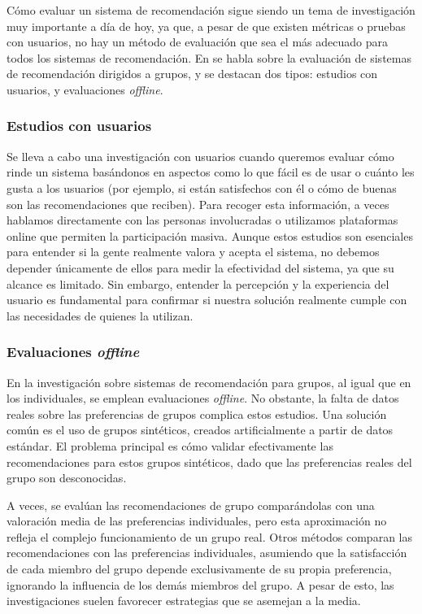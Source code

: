 Cómo evaluar un sistema de recomendación sigue siendo un tema de investigación muy importante a día de hoy, ya que, a pesar de que existen métricas o 
pruebas con usuarios, no hay un método de evaluación que sea el más adecuado para todos los sistemas de recomendación. En \cite{grouprecommender} se habla
sobre la evaluación de sistemas de recomendación dirigidos a grupos, y se destacan dos tipos: estudios con usuarios, y evaluaciones \textit{offline}.

\subsubsection{Estudios con usuarios}

Se lleva a cabo una investigación con usuarios cuando queremos evaluar cómo rinde un sistema basándonos en aspectos como lo que fácil es de usar o cuánto 
les gusta a los usuarios (por ejemplo, si están satisfechos con él o cómo de buenas son las recomendaciones que reciben). Para recoger esta información, a 
veces hablamos directamente con las personas involucradas o utilizamos plataformas online que permiten la participación masiva. Aunque estos estudios son 
esenciales para entender si la gente realmente valora y acepta el sistema, no debemos depender únicamente de ellos para medir la efectividad del sistema, 
ya que su alcance es limitado. Sin embargo, entender la percepción y la experiencia del usuario es fundamental para confirmar si nuestra solución realmente 
cumple con las necesidades de quienes la utilizan.

\subsubsection{Evaluaciones \textit{offline}}

En la investigación sobre sistemas de recomendación para grupos, al igual que en los individuales, se emplean evaluaciones \textit{offline}. No obstante, 
la falta de datos reales sobre las preferencias de grupos complica estos estudios. Una solución común es el uso de grupos sintéticos, creados artificialmente
 a partir de datos estándar. El problema principal es cómo validar efectivamente las recomendaciones para estos grupos sintéticos, dado que las preferencias 
 reales del grupo son desconocidas.

A veces, se evalúan las recomendaciones de grupo comparándolas con una valoración media de las preferencias individuales, pero esta aproximación no 
refleja el complejo funcionamiento de un grupo real. Otros métodos comparan las recomendaciones con las preferencias individuales, asumiendo que la satisfacción de 
cada miembro del grupo depende exclusivamente de su propia preferencia, ignorando la influencia de los demás miembros del grupo. A pesar de esto, las 
investigaciones suelen favorecer estrategias que se asemejan a la media.

